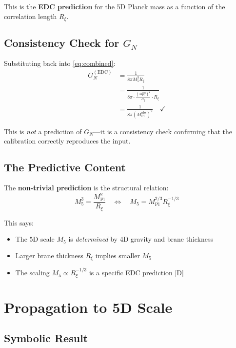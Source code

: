 \documentclass[11pt,a4paper]{article}
\newcommand{\Mpl}{M_{\text{Pl}}}
\newcommand{\Mfive}{M_5}
\newcommand{\GN}{G_N}
\newcommand{\Rxi}{R_\xi}
\newcommand{\obs}{\text{obs}}
\begin{document}
This is the \textbf{EDC prediction} for the 5D Planck mass as a function
of the correlation length $\Rxi$.

\subsection{Consistency Check for $\GN$}

Substituting back into \eqref{eq:combined}:
\begin{align}
\GN^{(\text{EDC})} &= \frac{1}{8\pi \Mfive^3 \Rxi} \nonumber \\
&= \frac{1}{8\pi \cdot \frac{(\Mpl^{\obs})^2}{\Rxi} \cdot \Rxi} \nonumber \\
&= \frac{1}{8\pi (\Mpl^{\obs})^2} \quad \checkmark
\end{align}

This is \emph{not} a prediction of $\GN$---it is a consistency check
confirming that the calibration correctly reproduces the input.

\subsection{The Predictive Content}

The \textbf{non-trivial prediction} is the structural relation:
\begin{equation}
\label{eq:structural}
\Mfive^3 = \frac{\Mpl^2}{\Rxi}
\quad \Leftrightarrow \quad
\Mfive = \Mpl^{2/3} \Rxi^{-1/3}
\end{equation}

This says:
\begin{itemize}
    \item The 5D scale $\Mfive$ is \emph{determined} by 4D gravity and brane thickness
    \item Larger brane thickness $\Rxi$ implies smaller $\Mfive$
    \item The scaling $\Mfive \propto \Rxi^{-1/3}$ is a specific EDC prediction [D]
\end{itemize}

\section{Propagation to 5D Scale}
\label{sec:propagation}

\subsection{Symbolic Result}
\end{document}
